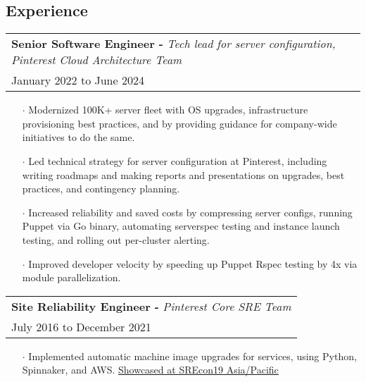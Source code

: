 \documentclass[letterpaper, oneside, final]{scrartcl} %
\begin{document}
\begin{center}
\section{Experience}

\renewcommand{\arraystretch}{1.3}
\begingroup\setlength{\fboxsep}{0pt}
\colorbox{mygray}{
\begin{flushleft}
\begin{tabularx}{\textwidth}{l}
\textbf{Senior Software Engineer -} \textit{Tech lead for server configuration, Pinterest Cloud Architecture Team}\\
January 2022 to June 2024\\
\end{tabularx}
\end{flushleft}
}\endgroup
\vspace{-0.1cm}
\begin{itemize} \itemsep-0.2cm


\item[$\cdot$] Modernized 100K+ server fleet with OS upgrades, infrastructure provisioning best practices, and by providing guidance for company-wide initiatives to do the same.\\[10pt]
\item[$\cdot$] Led technical strategy for server configuration at Pinterest, including writing roadmaps and making reports and presentations on upgrades, best practices, and contingency planning.\\[10pt]
\item[$\cdot$] Increased reliability and saved costs by compressing server configs, running Puppet via Go binary, automating serverspec testing and instance launch testing, and rolling out per-cluster alerting.\\[10pt]
\item[$\cdot$] Improved developer velocity by speeding up Puppet Rspec testing by 4x via module parallelization.\\[10pt]

\end{itemize}


\begingroup\setlength{\fboxsep}{0pt}
\colorbox{mygray}{
\begin{flushleft}
\begin{tabularx}{\textwidth}{l}
\textbf{Site Reliability Engineer -} \textit{Pinterest Core SRE Team}\\
July 2016 to December 2021\\
\end{tabularx}
\end{flushleft}
}\endgroup
\vspace{-0.1cm}
\begin{itemize} \itemsep-0.2cm
\item[$\cdot$] Implemented automatic machine image upgrades for services, using Python, Spinnaker, and AWS. \underline{\href{https://www.usenix.org/conference/srecon19asia/presentation/menezes}{Showcased at SREcon19 Asia/Pacific}}\\[10pt]


\end{itemize}
\end{center}
\end{document}
